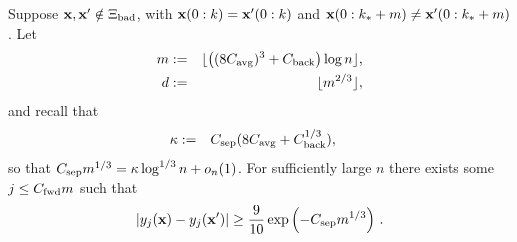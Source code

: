 \documentclass[final,12pt]{colt2018} %
\newcommand{\1}{\mathbf{1}}
\newcommand{\eqb}{\begin{equation}}
\newcommand{\eqe}{\end{equation}}
\def\x{{\bf x}}
\def\csep{C_{\rm sep}} %
\def\cfwd{C_{\rm fwd}} %
\def\cback{C_{\rm back}}
\def\cavg{C_{\rm avg}}
\def\bad{{\Xi_{\rm bad}}}
\begin{document}
\begin{lemma} \label{lem:separates}
	Suppose $\x , \x' \notin \bad$, with $\x (0:k) = \x' (0:k)$ and
	$\x (0 : k_* + m) \neq \x' (0 : k_* + m)$.  Let
	\begin{eqnarray} \label{eq:m}
	m & := & \lfloor \left ( (8 \cavg)^3 + \cback \right )\log n\rfloor, \\
	d & := & \lfloor m^{2/3}\rfloor , \nonumber
	\end{eqnarray}
	and recall that
	\begin{eqnarray*}
		\kappa & := & \csep (8 \cavg + \cback^{1/3}),~~~ \nonumber
	\end{eqnarray*}
	so that $\csep m^{1/3} = \kappa \log^{1/3} n+o_n(1)$. For sufficiently large $n$ there exists some $j \leq \cfwd m$ such that
	\eqb \label{eq:sep 4}
	\left | y_j (\x) - y_j (\x') \right | \geq \frac{9}{10}
	\exp \left ( - \csep m^{1/3} \right ) \, .
	\eqe
\end{lemma}
\end{document}
